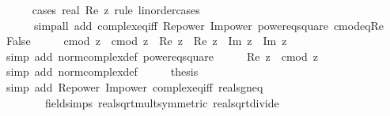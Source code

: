 \begin{isabellebody}
\ \ \ \ \isamarkupfalse%
\ {\isacharparenleft}{\kern0pt}cases\ {\isachardoublequoteopen}{}{\isacharcolon}{\kern0pt}{\isacharcolon}{\kern0pt}real{\isachardoublequoteclose}\ {\isachardoublequoteopen}Re\ z{\isachardoublequoteclose}\ rule{\isacharcolon}{\kern0pt}\ linorder{\isacharunderscore}{\kern0pt}cases{\isacharparenright}{\kern0pt}\isanewline
\ \ \ \ \ \ {\isacharparenleft}{\kern0pt}simp{\isacharunderscore}{\kern0pt}all\ add{\isacharcolon}{\kern0pt}\ complex{\isacharunderscore}{\kern0pt}eq{\isacharunderscore}{\kern0pt}iff\ Re{\isacharunderscore}{\kern0pt}power{}\ Im{\isacharunderscore}{\kern0pt}power{}\ power{}{\isacharunderscore}{\kern0pt}eq{\isacharunderscore}{\kern0pt}square\ cmod{\isacharunderscore}{\kern0pt}eq{\isacharunderscore}{\kern0pt}Re{\isacharparenright}{\kern0pt}\isanewline
{}\isamarkupfalse%
\isanewline
\ \ \isamarkupfalse%
\ False\isanewline
\ \ \isamarkupfalse%
\ \isamarkupfalse%
\ {\isachardoublequoteopen}cmod\ z\ {\isacharasterisk}{\kern0pt}\ cmod\ z\ {\isacharminus}{\kern0pt}\ Re\ z\ {\isacharasterisk}{\kern0pt}\ Re\ z\ {\isacharequal}{\kern0pt}\ Im\ z\ {\isacharasterisk}{\kern0pt}\ Im\ z{\isachardoublequoteclose}\isanewline
\ \ \ \ \isamarkupfalse%
\ {\isacharparenleft}{\kern0pt}simp\ add{\isacharcolon}{\kern0pt}\ norm{\isacharunderscore}{\kern0pt}complex{\isacharunderscore}{\kern0pt}def\ power{}{\isacharunderscore}{\kern0pt}eq{\isacharunderscore}{\kern0pt}square{\isacharparenright}{\kern0pt}\isanewline
\ \ \isamarkupfalse%
\ \isamarkupfalse%
\ {\isachardoublequoteopen}{\isasymbar}Re\ z{\isasymbar}\ {\isasymle}\ cmod\ z{\isachardoublequoteclose}\isanewline
\ \ \ \ \isamarkupfalse%
\ {\isacharparenleft}{\kern0pt}simp\ add{\isacharcolon}{\kern0pt}\ norm{\isacharunderscore}{\kern0pt}complex{\isacharunderscore}{\kern0pt}def{\isacharparenright}{\kern0pt}\isanewline
\ \ \isamarkupfalse%
\ \isamarkupfalse%
\ {\isacharquery}{\kern0pt}thesis\isanewline
\ \ \ \ \isamarkupfalse%
\ {\isacharparenleft}{\kern0pt}simp\ add{\isacharcolon}{\kern0pt}\ Re{\isacharunderscore}{\kern0pt}power{}\ Im{\isacharunderscore}{\kern0pt}power{}\ complex{\isacharunderscore}{\kern0pt}eq{\isacharunderscore}{\kern0pt}iff\ real{\isacharunderscore}{\kern0pt}sgn{\isacharunderscore}{\kern0pt}eq\isanewline
\ \ \ \ \ \ \ \ field{\isacharunderscore}{\kern0pt}simps\ real{\isacharunderscore}{\kern0pt}sqrt{\isacharunderscore}{\kern0pt}mult{\isacharbrackleft}{\kern0pt}symmetric{\isacharbrackright}{\kern0pt}\ real{\isacharunderscore}{\kern0pt}sqrt{\isacharunderscore}{\kern0pt}divide{\isacharparenright}{\kern0pt}\isanewline

\end{isabellebody}
